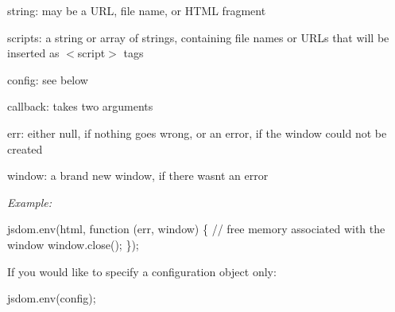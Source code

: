 \begin{DoxyItemize}
\item {\ttfamily string}\+: may be a U\+RL, file name, or H\+T\+ML fragment
\item {\ttfamily scripts}\+: a string or array of strings, containing file names or U\+R\+Ls that will be inserted as {\ttfamily $<$script$>$} tags
\item {\ttfamily config}\+: see below
\item {\ttfamily callback}\+: takes two arguments
\begin{DoxyItemize}
\item {\ttfamily err}\+: either {\ttfamily null}, if nothing goes wrong, or an error, if the window could not be created
\item {\ttfamily window}\+: a brand new {\ttfamily window}, if there wasn\textquotesingle{}t an error
\end{DoxyItemize}
\end{DoxyItemize}

{\itshape Example\+:}


\begin{DoxyCode}
jsdom.env(html, function (err, window) \{
  // free memory associated with the window
  window.close();
\});
\end{DoxyCode}


If you would like to specify a configuration object only\+:


\begin{DoxyCode}
jsdom.env(config);
\end{DoxyCode}



